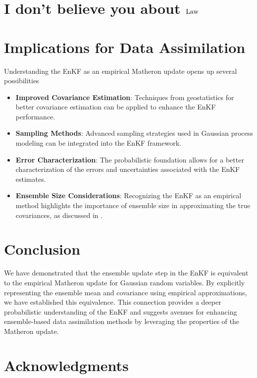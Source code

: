 \documentclass{article}
\begin{document}
\section{I don't believe you about $\operatorname{Law}$} \label{sec:density-please}

\section{Implications for Data Assimilation}

Understanding the EnKF as an empirical Matheron update opens up several possibilities

\begin{itemize}
    \item \textbf{Improved Covariance Estimation}: Techniques from geostatistics for better covariance estimation can be applied to enhance the EnKF performance.
    \item \textbf{Sampling Methods}: Advanced sampling strategies used in Gaussian process modeling can be integrated into the EnKF framework.
    \item \textbf{Error Characterization}: The probabilistic foundation allows for a better characterization of the errors and uncertainties associated with the EnKF estimates.
    \item \textbf{Ensemble Size Considerations}: Recognizing the EnKF as an empirical method highlights the importance of ensemble size in approximating the true covariances, as discussed in \citet{Fearnhead2018Particle}.
\end{itemize}

\section{Conclusion}

We have demonstrated that the ensemble update step in the EnKF is equivalent to the empirical Matheron update for Gaussian random variables. By explicitly representing the ensemble mean and covariance using empirical approximations, we have established this equivalence. This connection provides a deeper probabilistic understanding of the EnKF and suggests avenues for enhancing ensemble-based data assimilation methods by leveraging the properties of the Matheron update.

\section*{Acknowledgments}




\end{document}
